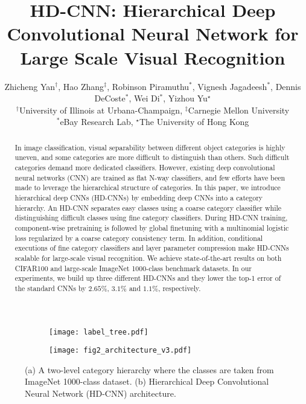 \documentclass[10pt,twocolumn,letterpaper]{article}
\begin{document}
\title{HD-CNN: Hierarchical Deep Convolutional Neural Network for Large Scale
Visual Recognition}

\author{Zhicheng Yan$^\dag$,
Hao Zhang$^\ddag$,
Robinson Piramuthu$^\ast$,
Vignesh Jagadeesh$^\ast$,
Dennis DeCoste$^\ast$,
Wei Di$^\ast$,
Yizhou Yu$^\star$\\
$^\dag$University of Illinois at Urbana-Champaign,
$^\ddag$Carnegie Mellon University\\
$^\ast$eBay Research Lab,
$^\star$The University of Hong Kong
}

\maketitle


\setlength{\textfloatsep}{1em}

\begin{abstract}

In image classification, visual separability between different object categories is highly uneven, and some categories are more difficult to distinguish than others. Such difficult categories demand more dedicated classifiers. However, existing deep convolutional neural networks (CNN) are trained as flat N-way classifiers, and few efforts have been made to leverage the hierarchical structure of categories. In this paper, we introduce hierarchical deep CNNs (HD-CNNs) by embedding deep CNNs into a category hierarchy. An HD-CNN separates easy classes using a coarse category classifier while distinguishing difficult classes using fine category classifiers. During HD-CNN training, component-wise pretraining is followed by global finetuning with a multinomial logistic loss regularized by a coarse category consistency term. In addition, conditional executions of fine category classifiers  and layer parameter compression make HD-CNNs scalable for large-scale visual recognition. We achieve state-of-the-art results on both CIFAR100 and large-scale ImageNet 1000-class benchmark datasets. In our experiments, we build up three different HD-CNNs and they lower the top-1 error of the standard CNNs by $2.65\%$, $3.1\%$ and $1.1\%$, respectively. 

\end{abstract}

\begin{figure*}[ht]
\centering
\begin{subfigure}{.22\textwidth}
  \centering
  \texttt{[image: label\_tree.pdf]}
  \caption{}
\end{subfigure}\begin{subfigure}{.72\textwidth}
  \centering
  \texttt{[image: fig2\_architecture\_v3.pdf]}
  \caption{}
\end{subfigure}
\vspace{-2em}
\caption{(a) A two-level category hierarchy where the classes are taken from ImageNet 1000-class dataset. (b) Hierarchical Deep Convolutional Neural Network (HD-CNN) architecture.}
\label{fig:architecture}
\vspace{-2em}
\end{figure*}
\end{document}
